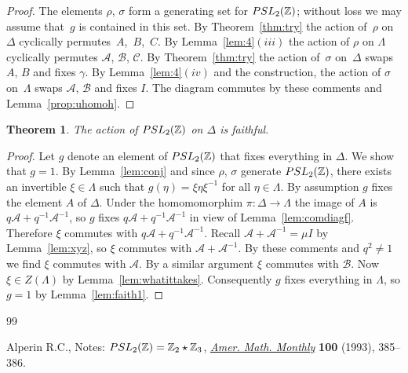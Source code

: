 \documentclass[10pt,a4paper]{amsart}
\numberwithin{equation}{section}
\newtheorem{Theorem}{Theorem}[section]
\begin{document}
\begin{proof}
The elements
$\rho$, $\sigma$ form a generating set for
${\rm  {PSL}}_2(\mathbb Z)$; without loss
we may assume that~$g$ is contained in this set.
By Theorem~\ref{thm:try}
the action of~$\rho$ on~$\Delta $
cyclically permutes~$A$,~$B$,~$C$.
By Lemma~\ref{lem:4}$(iii)$
the action of $\rho$ on $\Lambda $
cyclically permutes
$\mathcal A$, $\mathcal B$, $\mathcal C$.
By Theorem~\ref{thm:try}
the action of~$\sigma$ on~$\Delta $ swaps $A$, $B$ and f\/ixes
$\gamma$. By Lemma~\ref{lem:4}$(iv)$ and the construction,
the action of $\sigma $ on~$\Lambda $ swaps $\mathcal A$, $\mathcal B$
and f\/ixes $ I$.
The diagram commutes by these comments
and Lemma~\ref{prop:uhomoh}.
\end{proof}

\begin{Theorem}
\label{thm:faith}
The action of
${\rm  {PSL}}_2(\mathbb Z)$ on $\Delta $ is faithful.
\end{Theorem}

\begin{proof}
Let $g$ denote an element of
${\rm  {PSL}}_2(\mathbb Z)$ that f\/ixes everything in
$\Delta $.
We show that $g=1$.
By Lemma~\ref{lem:conj} and since $\rho$, $\sigma$ generate
${\rm  {PSL}}_2(\mathbb Z)$, there exists an invertible
$\xi \in \Lambda $ such that $g(\eta)=\xi \eta \xi^{-1}$ for
all $\eta  \in \Lambda $. By assumption
$g$ f\/ixes the element $A$ of $\Delta $. Under
the homomomorphim
$\pi : \Delta  \to \Lambda $ the image of $A$ is
$q\mathcal A+q^{-1}{\mathcal A}^{-1}$,
so $g$ f\/ixes
$q\mathcal A+q^{-1}{\mathcal A}^{-1}$ in view of Lemma~\ref{lem:comdiagf}. Therefore $\xi $ commutes
with
$q\mathcal A+q^{-1}{\mathcal A}^{-1}$.
Recall $\mathcal A+{\mathcal A}^{-1} =\mu I$ by
Lemma~\ref{lem:xyz}, so $\xi$ commutes with
$\mathcal A+{\mathcal A}^{-1}$.
By these comments and $q^2\not=1$ we f\/ind
$\xi$ commutes with $\mathcal A$. By a similar
argument $\xi$ commutes with $\mathcal B$. Now
$\xi \in Z(\Lambda )$ by
Lemma~\ref{lem:whatittakes}.
Consequently $g$ f\/ixes everything in $\Lambda $, so $g=1$
 by Lemma~\ref{lem:faith1}.
\end{proof}

\begin{thebibliography}{99}

\footnotesize\itemsep=0pt
Alperin R.C.,
Notes: ${\rm  {PSL}}_2(\mathbb Z)= \mathbb Z_2 \star \mathbb Z_3$,
\href{http://dx.doi.org/10.2307/2324963}{{\it Amer. Math. Monthly}} {\bf 100} (1993), 385--386.
\end{thebibliography}
\end{document}
